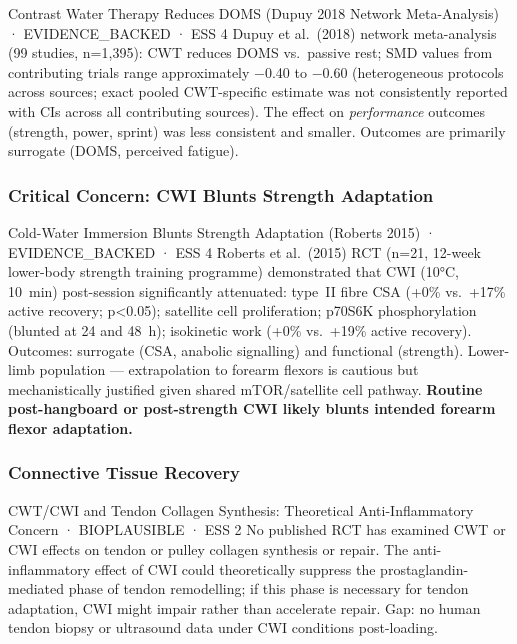 \begin{evidencebox}{Contrast Water Therapy Reduces DOMS (Dupuy 2018 Network Meta-Analysis) · EVIDENCE\_BACKED · ESS 4}
Dupuy et al.\ (2018) network meta-analysis (99 studies, n=1,395): CWT reduces DOMS vs.\ passive rest; SMD values from contributing trials range approximately $-$0.40 to $-$0.60 (heterogeneous protocols across sources; exact pooled CWT-specific estimate was not consistently reported with CIs across all contributing sources). The effect on \emph{performance} outcomes (strength, power, sprint) was less consistent and smaller. Outcomes are primarily surrogate (DOMS, perceived fatigue). \cite{DDTE18}
\end{evidencebox}

\subsubsection*{Critical Concern: CWI Blunts Strength Adaptation}

\begin{evidencebox}{Cold-Water Immersion Blunts Strength Adaptation (Roberts 2015) · EVIDENCE\_BACKED · ESS 4}
Roberts et al.\ (2015) RCT (n=21, 12-week lower-body strength training programme) demonstrated that CWI (10°C, 10~min) post-session significantly attenuated: type~II fibre CSA (+0\% vs.\ +17\% active recovery; p<0.05); satellite cell proliferation; p70S6K phosphorylation (blunted at 24 and 48~h); isokinetic work (+0\% vs.\ +19\% active recovery). Outcomes: surrogate (CSA, anabolic signalling) and functional (strength). Lower-limb population --- extrapolation to forearm flexors is cautious but mechanistically justified given shared mTOR/satellite cell pathway. \textbf{Routine post-hangboard or post-strength CWI likely blunts intended forearm flexor adaptation.} \cite{RRME15}
\end{evidencebox}

\subsubsection*{Connective Tissue Recovery}

\begin{bioplausbox}{CWT/CWI and Tendon Collagen Synthesis: Theoretical Anti-Inflammatory Concern · BIOPLAUSIBLE · ESS 2}
No published RCT has examined CWT or CWI effects on tendon or pulley collagen synthesis or repair. The anti-inflammatory effect of CWI could theoretically suppress the prostaglandin-mediated phase of tendon remodelling; if this phase is necessary for tendon adaptation, CWI might impair rather than accelerate repair. Gap: no human tendon biopsy or ultrasound data under CWI conditions post-loading.
\end{bioplausbox}

